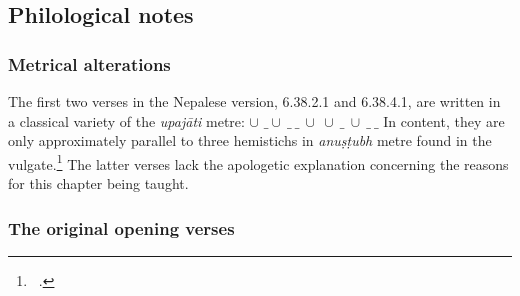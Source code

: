     
    \subsection{Philological notes}
    
    \subsubsection{Metrical alterations}
    
The first two verses in the Nepalese version, 6.38.2.1 and 6.38.4.1, are
written in a classical variety of the \emph{upajāti} metre:
\underline{$\cup$} $\_ \cup\ \_\ \_\ \cup\ \cup\ \_\ \cup\ \_\ \_$ In
content, they are only approximately parallel to three hemistichs in
\emph{anuṣṭubh} metre found in the vulgate.\footnote{\SS\ 
.}
The
latter verses lack the apologetic explanation concerning the reasons for
this chapter being taught.
        
\subsubsection{The original opening verses}

